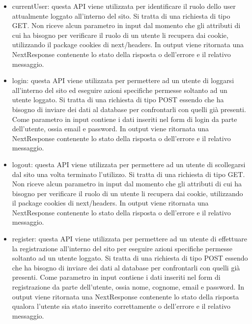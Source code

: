 \documentclass[a4paper,12pt]{article}
\begin{document}
\begin{itemize}
    \item currentUser: \newline
    questa API viene utilizzata per identificare il ruolo dello user attualmente loggato all'interno del sito. \newline
    Si tratta di una richiesta di tipo GET. \newline
    Non riceve alcun parametro in input dal momento che gli attributi di cui ha bisogno per verificare il ruolo di un utente li recupera dai cookie, utilizzando il package cookies di next/headers. \newline
    In output viene ritornata una NextResponse contenente lo stato della risposta o dell'errore e il relativo messaggio.
    \item login: \newline
    questa API viene utilizzata per permettere ad un utente di loggarsi all'interno del sito ed eseguire azioni specifiche permesse soltanto ad un utente loggato. \newline
    Si tratta di una richiesta di tipo POST essendo che ha bisogno di inviare dei dati al database per confrontarli con quelli già presenti. \newline
    Come parametro in input contiene i dati inseriti nel form di login da parte dell'utente, ossia email e password. \newline
    In output viene ritornata una NextResponse contenente lo stato della risposta o dell'errore e il relativo messaggio.
    \item logout: \newline
    questa API viene utilizzata per permettere ad un utente di scollegarsi dal sito una volta terminato l'utilizzo. \newline
    Si tratta di una richiesta di tipo GET. \newline
    Non riceve alcun parametro in input dal momento che gli attributi di cui ha bisogno per verificare il ruolo di un utente li recupera dai cookie, utilizzando il package cookies di next/headers. \newline
    In output viene ritornata una NextResponse contenente lo stato della risposta o dell'errore e il relativo messaggio.
    \item register: \newline
    questa API viene utilizzata per permettere ad un utente di effettuare la registrazione all'interno del sito per eseguire azioni specifiche permesse soltanto ad un utente loggato. \newline
    Si tratta di una richiesta di tipo POST essendo che ha bisogno di inviare dei dati al database per confrontarli con quelli già presenti. \newline
    Come parametro in input contiene i dati inseriti nel form di registrazione da parte dell'utente, ossia nome, cognome, email e password. \newline
    In output viene ritornata una NextResponse contenente lo stato della risposta qualora l'utente sia stato inserito correttamente o dell'errore e il relativo messaggio.
\end{itemize}
\end{document}

